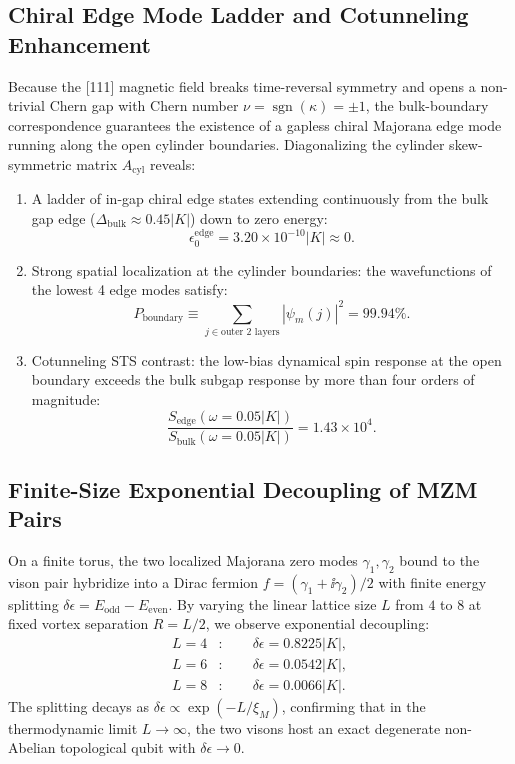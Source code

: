 \subsection{Chiral Edge Mode Ladder and Cotunneling Enhancement}
Because the [111] magnetic field breaks time-reversal symmetry and opens a non-trivial Chern gap with Chern number $\nu = \operatorname{sgn}(\kappa) = \pm 1$, the bulk-boundary correspondence guarantees the existence of a gapless chiral Majorana edge mode running along the open cylinder boundaries.
Diagonalizing the cylinder skew-symmetric matrix $A_{\mathrm{cyl}}$ reveals:
\begin{enumerate}
    \item A ladder of in-gap chiral edge states extending continuously from the bulk gap edge ($\Delta_{\mathrm{bulk}} \approx 0.45 |K|$) down to zero energy:
    \begin{equation}
    \epsilon_0^{\mathrm{edge}} = 3.20 \times 10^{-10} |K| \approx 0.
    \end{equation}
    \item Strong spatial localization at the cylinder boundaries: the wavefunctions of the lowest 4 edge modes satisfy:
    \begin{equation}
    P_{\mathrm{boundary}} \equiv \sum_{j \in \text{outer 2 layers}} |\psi_m(j)|^2 = 99.94\%.
    \end{equation}
    \item Cotunneling STS contrast: the low-bias dynamical spin response at the open boundary exceeds the bulk subgap response by more than four orders of magnitude:
    \begin{equation}
    \frac{S_{\mathrm{edge}}(\omega = 0.05 |K|)}{S_{\mathrm{bulk}}(\omega = 0.05 |K|)} = 1.43 \times 10^4.
    \end{equation}
\end{enumerate}

\subsection{Finite-Size Exponential Decoupling of MZM Pairs}
On a finite torus, the two localized Majorana zero modes $\gamma_1, \gamma_2$ bound to the vison pair hybridize into a Dirac fermion $f = (\gamma_1 + \ii \gamma_2)/2$ with finite energy splitting $\delta \epsilon = E_{\mathrm{odd}} - E_{\mathrm{even}}$. By varying the linear lattice size $L$ from $4$ to $8$ at fixed vortex separation $R = L/2$, we observe exponential decoupling:
\begin{align}
L = 4 &: \qquad \delta \epsilon = 0.8225 |K|, \\
L = 6 &: \qquad \delta \epsilon = 0.0542 |K|, \\
L = 8 &: \qquad \delta \epsilon = 0.0066 |K|.
\end{align}
The splitting decays as $\delta \epsilon \propto \exp(-L / \xi_M)$, confirming that in the thermodynamic limit $L \to \infty$, the two visons host an exact degenerate non-Abelian topological qubit with $\delta \epsilon \to 0$.


